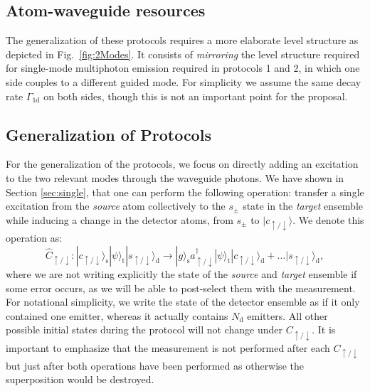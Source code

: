 \documentclass[twocolumn,pra,aps,superscriptaddress,showpacs]{revtex4-1}
\newcommand{\ket}[1]{|#1\rangle}
\def\oned{\mathrm{1d}}
\newcommand{\rs}{\mathrm{s}}
\newcommand{\rd}{\mathrm{d}}
\newcommand{\rt}{\mathrm{t}}
\begin{document}
\subsection{Atom-waveguide resources}

The generalization of these protocols requires a more elaborate level structure as depicted in Fig.~\ref{fig:2Modes}. It consists of \emph{mirroring} the level structure required for single-mode multiphoton emission required in protocols 1 and 2, in which one side couples to a different guided mode. For simplicity we assume the same decay rate $\Gamma_\oned$ on both sides, though this is not an important point for the proposal.

\subsection{Generalization of Protocols}

For the generalization of the protocols, we focus on directly adding an excitation to the two relevant modes through the waveguide photons. We have shown in Section \ref{sec:single}, that one can perform the following operation: transfer a single excitation from the \emph{source} atom collectively to the $s_{\pm}$ state in the \emph{target} ensemble while inducing a change in the detector atoms, from $s_{\pm}$ to $\ket{c_{\uparrow/\downarrow}}$. We denote this operation as:
\begin{equation}
	\hat{C}_{\uparrow/\downarrow} : 
	\ket{c_{\uparrow/\downarrow}}_\rs \ket{\psi}_\rt \ket{s_{\uparrow/\downarrow}}_\rd 
	\rightarrow	
	\ket{g}_\rs a_{\uparrow/\downarrow}^\dagger \ket{\psi}_\rt \ket{c_{\uparrow/\downarrow}}_\rd 
	+ \ldots \ket{s_{\uparrow/\downarrow}}_\rd,
\end{equation}
%
where we are not writing explicitly the state of the \emph{source} and \emph{target} ensemble if some error occurs, as we will be able to post-select them with the measurement. For notational simplicity, we write the state of the detector ensemble as if it only contained one emitter, whereas it actually contains $N_\rd$ emitters.  All other possible initial states during the protocol will not change under $C_{\uparrow/\downarrow}$. It is important to emphasize that the measurement is not performed after each $C_{\uparrow / \downarrow}$ but just after both operations have been performed as otherwise the superposition would be destroyed.
\end{document}

